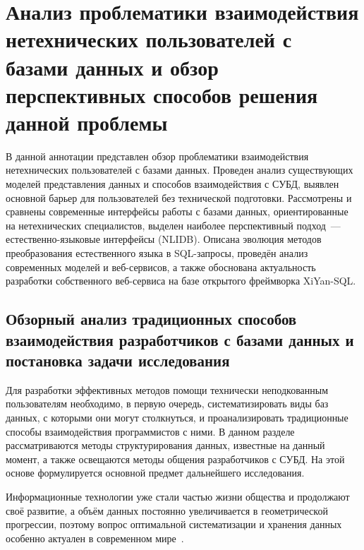 \chapter{Анализ проблематики взаимодействия нетехнических пользователей
  с базами данных и обзор перспективных способов решения данной проблемы}
\label{chapter1}

\begin{annotation}
      В данной аннотации представлен обзор проблематики взаимодействия нетехнических пользователей
      с базами данных. Проведен анализ существующих моделей представления данных и способов
      взаимодействия с СУБД, выявлен основной барьер для пользователей без технической подготовки.
      Рассмотрены и сравнены современные интерфейсы работы с базами данных,
      ориентированные на нетехнических специалистов, выделен наиболее перспективный подход~---
      естественно-языковые интерфейсы (NLIDB). Описана эволюция методов преобразования
      естественного языка в SQL-запросы, проведён анализ современных моделей и веб-сервисов,
      а также обоснована актуальность разработки собственного веб-сервиса на базе открытого
      фреймворка XiYan-SQL.
\end{annotation}




\section{Обзорный анализ традиционных способов взаимодействия разработчиков с базами данных и
  постановка задачи исследования}%
\begin{annotation}
      Для разработки эффективных методов помощи технически неподкованным пользователям необходимо,
      в первую очередь, систематизировать виды баз данных, с которыми они могут столкнуться, и
      проанализировать традиционные способы взаимодействия программистов с ними.
      В данном разделе рассматриваются методы структурирования данных, известные на данный момент,
      а также освещаются методы общения разработчиков с СУБД. На этой основе формулируется
      основной предмет дальнейшего исследования.
\end{annotation}

Информационные технологии уже стали частью жизни общества и продолжают своё развитие,
а объём данных постоянно увеличивается в геометрической прогрессии,
поэтому вопрос оптимальной систематизации и хранения данных особенно
актуален в современном мире~\cite{savoskinIssledovanieSposobovPrimeneniya2019}.

